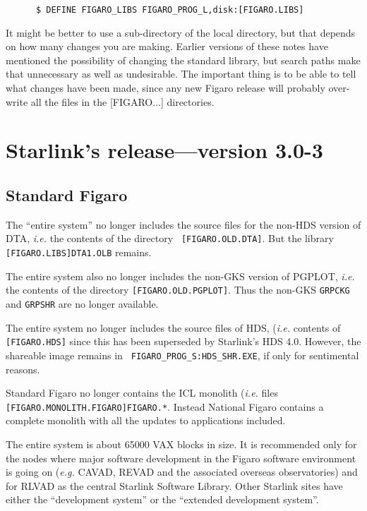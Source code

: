 \begin{verbatim}
      $ DEFINE FIGARO_LIBS FIGARO_PROG_L,disk:[FIGARO.LIBS]
\end{verbatim}

It might be better to use a sub-directory of the local directory, but that
depends on how many changes you are making. Earlier versions of these
notes have mentioned the possibility of changing the standard library, but
search paths make that unnecessary as well as undesirable. The important thing
is to be able to tell what changes have been made, since any new Figaro
release will probably over-write all the files in the [FIGARO...] directories.

\section{Starlink's release---version 3.0-3}
\label{Starnotes}

\subsection{Standard Figaro}

The ``entire system'' no longer includes the source files for the non-HDS
version of DTA, {\em i.e.\/} the contents of the directory {\tt
[FIGARO.\-OLD.DTA]}. But the library {\tt [FIGARO.LIBS]DTA1.OLB} remains.

The entire system also no longer includes the non-GKS version of PGPLOT, {\em
i.e.\/} the contents of the directory {\tt [FIGARO.\-OLD.PGPLOT]}. Thus the
non-GKS {\tt GRPCKG} and {\tt GRPSHR} are no longer available.

The entire system no longer includes the source files of HDS, ({\em i.e.\/}
contents of {\tt [FIGARO.HDS]} since this has been superseded by Starlink's HDS
4.0. However, the shareable image remains in {\tt
FIGARO\_\-PROG\_S:\-HDS\_SHR.EXE}, if only for sentimental reasons.

Standard Figaro no longer contains the ICL monolith ({\em i.e.\/} files {\tt
[FIGARO.\-MONOLITH.\-FIGARO]\-FIGARO.*}. Instead National Figaro contains a
complete monolith with all the updates to applications included.

The entire system is about 65000 VAX blocks in size. It is recommended only for
the nodes where major software development in the Figaro software environment
is going on ({\em e.g.\/} CAVAD, REVAD and the associated overseas
observatories) and for RLVAD as the central Starlink Software Library. Other
Starlink sites have either the ``development system'' or the ``extended
development system''.

